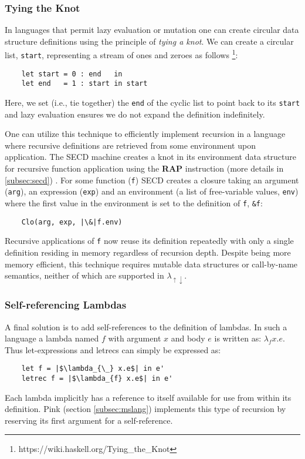 \documentclass[a4paper,12pt,twoside,openright]{report}
\theoremstyle{definition}
\newcommand{\mslang}{$\lambda_{\uparrow\downarrow}$}
\begin{document}
\subsubsection{Tying the Knot}\label{ssubsec:background_knot}
In languages that permit lazy evaluation or mutation one can create circular data structure definitions using the principle of \textit{tying a knot}. We can create a circular list, \texttt{start}, representing a stream of ones and zeroes as follows \footnote{https://wiki.haskell.org/Tying\_the\_Knot}:
\begin{verbatim}
    let start = 0 : end   in
    let end   = 1 : start in start
\end{verbatim}
Here, we set (i.e., tie together) the \texttt{end} of the cyclic list to point back to its \texttt{start} and lazy evaluation ensures we do not expand the definition indefinitely.

One can utilize this technique to efficiently implement recursion in a language where recursive definitions are retrieved from some environment upon application. The SECD machine creates a knot in its environment data structure for recursive function application using the \textbf{RAP} instruction (more details in \ref{subsec:secd}) \cite{paulson1995foundations}. For some function (\texttt{f}) SECD creates a closure taking an argument (\texttt{arg}), an expression (\texttt{exp}) and an environment (a list of free-variable values, \texttt{env}) where the first value in the environment is set to the definition of \texttt{f}, \texttt{\&f}:
\begin{verbatim}
    Clo(arg, exp, |\&|f.env)
\end{verbatim}
Recursive applications of \texttt{f} now reuse its definition repeatedly with only a single definition residing in memory regardless of recursion depth. Despite being more memory efficient, this technique requires mutable data structures or call-by-name semantics, neither of which are supported in \mslang.

\subsubsection{Self-referencing Lambdas}
A final solution is to add self-references to the definition of lambdas. In such a language a lambda named $f$ with argument $x$ and body $e$ is written as: $\lambda_f x.e$. Thus let-expressions and letrecs can simply be expressed as:
\begin{verbatim}
    let f = |$\lambda_{\_} x.e$| in e'
    letrec f = |$\lambda_{f} x.e$| in e'
\end{verbatim}
Each lambda implicitly has a reference to itself available for use from within its definition. Pink (section \ref{subsec:mslang}) implements this type of recursion by reserving its first argument for a self-reference.
\end{document}
